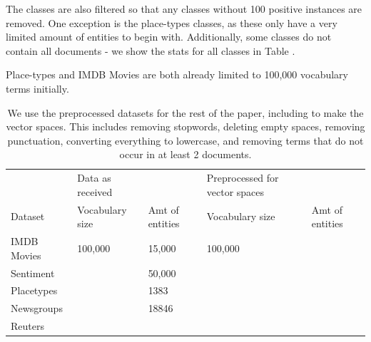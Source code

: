 The classes are also filtered so that any classes without 100 positive instances are removed. One exception is the place-types classes, as these only have a very limited amount of entities to begin with. Additionally, some classes do not contain all documents - we show the stats for all classes in Table \label{table:ClassStats}.

Place-types and IMDB Movies are both already limited to 100,000 vocabulary terms initially.

\begin{table}[]
	\begin{tabular}{lllll}
		& Data as received &                 & Preprocessed for vector spaces &                 \\
		Dataset     & Vocabulary size  & Amt of entities & Vocabulary size                & Amt of entities \\
		IMDB Movies & 100,000          & 15,000          & 100,000                        &                 \\
		Sentiment   &                  & 50,000          &                                &                 \\
		Placetypes  &                  & 1383            &                                &                 \\
		Newsgroups  &                  & 18846           &                                &                 \\
		Reuters     &                  &                 &                                &                
	\end{tabular}
	\caption{We use the preprocessed datasets for the rest of the paper, including to make the vector spaces. This includes removing stopwords, deleting empty spaces, removing punctuation, converting everything to lowercase, and removing terms that do not occur in at least 2 documents.}  
	\label{table:DatasetStats}
\end{table}

